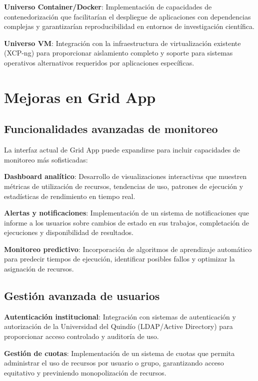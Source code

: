 \textbf{Universo Container/Docker}: Implementación de capacidades de contenedorización que facilitarían el despliegue de aplicaciones con dependencias complejas y garantizarían reproducibilidad en entornos de investigación científica.

\textbf{Universo VM}: Integración con la infraestructura de virtualización existente (XCP-ng) para proporcionar aislamiento completo y soporte para sistemas operativos alternativos requeridos por aplicaciones específicas.

\section{Mejoras en Grid App}
\noindent

\subsection{Funcionalidades avanzadas de monitoreo}
\noindent

La interfaz actual de Grid App puede expandirse para incluir capacidades de monitoreo más sofisticadas:

\textbf{Dashboard analítico}: Desarrollo de visualizaciones interactivas que muestren métricas de utilización de recursos, tendencias de uso, patrones de ejecución y estadísticas de rendimiento en tiempo real.

\textbf{Alertas y notificaciones}: Implementación de un sistema de notificaciones que informe a los usuarios sobre cambios de estado en sus trabajos, completación de ejecuciones y disponibilidad de resultados.

\textbf{Monitoreo predictivo}: Incorporación de algoritmos de aprendizaje automático para predecir tiempos de ejecución, identificar posibles fallos y optimizar la asignación de recursos.

\subsection{Gestión avanzada de usuarios}
\noindent

\textbf{Autenticación institucional}: Integración con sistemas de autenticación y autorización de la Universidad del Quindío (LDAP/Active Directory) para proporcionar acceso controlado y auditoría de uso.

\textbf{Gestión de cuotas}: Implementación de un sistema de cuotas que permita administrar el uso de recursos por usuario o grupo, garantizando acceso equitativo y previniendo monopolización de recursos.

